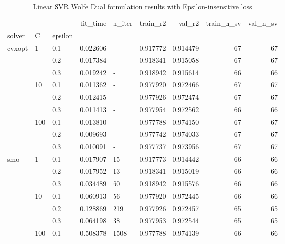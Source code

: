 \begin{table}[h!]
\centering
\caption{Linear SVR Wolfe Dual formulation results with Epsilon-insensitive loss}
\label{linear_dual_svr_cv_results}
\begin{tabular}{lllrlrrrr}
\toprule
       &     &     &  fit\_time & n\_iter &  train\_r2 &    val\_r2 &  train\_n\_sv &  val\_n\_sv \\
solver & C & epsilon &           &        &           &           &             &           \\
\midrule
cvxopt & 1   & 0.1 &  0.022606 &      - &  0.917772 &  0.914479 &          67 &        67 \\
       &     & 0.2 &  0.017384 &      - &  0.918341 &  0.915058 &          67 &        67 \\
       &     & 0.3 &  0.019242 &      - &  0.918942 &  0.915614 &          66 &        66 \\
       & 10  & 0.1 &  0.011362 &      - &  0.977920 &  0.972466 &          67 &        67 \\
       &     & 0.2 &  0.012415 &      - &  0.977926 &  0.972474 &          67 &        67 \\
       &     & 0.3 &  0.011413 &      - &  0.977954 &  0.972562 &          66 &        66 \\
       & 100 & 0.1 &  0.013810 &      - &  0.977788 &  0.974150 &          67 &        67 \\
       &     & 0.2 &  0.009693 &      - &  0.977742 &  0.974033 &          67 &        67 \\
       &     & 0.3 &  0.010091 &      - &  0.977737 &  0.973956 &          67 &        67 \\
smo & 1   & 0.1 &  0.017907 &     15 &  0.917773 &  0.914442 &          66 &        66 \\
       &     & 0.2 &  0.017952 &     13 &  0.918341 &  0.915019 &          66 &        66 \\
       &     & 0.3 &  0.034489 &     60 &  0.918942 &  0.915576 &          66 &        66 \\
       & 10  & 0.1 &  0.060913 &     56 &  0.977920 &  0.972445 &          66 &        66 \\
       &     & 0.2 &  0.128869 &    219 &  0.977926 &  0.972457 &          65 &        65 \\
       &     & 0.3 &  0.064198 &     38 &  0.977953 &  0.972544 &          65 &        65 \\
       & 100 & 0.1 &  0.508378 &   1508 &  0.977788 &  0.974139 &          66 &        66 \\

\end{tabular}
\end{table}
